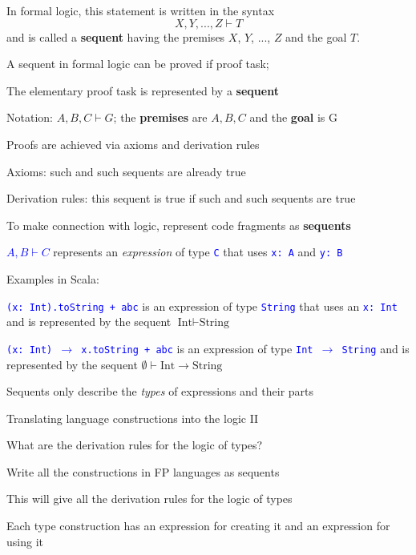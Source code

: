 In formal logic, this statement is written in the syntax
\[
X,Y,...,Z\vdash T
\]
and is called a \textbf{sequent} having
the premises $X$, $Y$, ..., $Z$ and the goal $T$.

A sequent in formal logic can be proved if proof task;

The elementary proof task is represented by a \textbf{sequent}

Notation: $A,B,C\vdash G$; the \textbf{premises} are $A,B,C$ and
the \textbf{goal} is G

Proofs are achieved via axioms and derivation rules

Axioms: such and such sequents are already true

Derivation rules: this sequent is true if such and such sequents are
true

To make connection with logic, represent code fragments as \textbf{sequents}

\textcolor{blue}{$A,B\vdash C$} represents an \emph{expression} of
type \texttt{\textcolor{blue}{\footnotesize{}C}} that uses \texttt{\textcolor{blue}{\footnotesize{}x:\ A}}
and \texttt{\textcolor{blue}{\footnotesize{}y:\ B}}{\footnotesize\par}

Examples in Scala:

\texttt{\textcolor{blue}{\footnotesize{}(x:\ Int).toString + \textquotedbl abc\textquotedbl}}
is an expression of type \texttt{\textcolor{blue}{\footnotesize{}String}}
that uses an \texttt{\textcolor{blue}{\footnotesize{}x:\ Int}} and
is represented by the sequent $\text{Int}\vdash\text{String}$

\texttt{\textcolor{blue}{\footnotesize{}(x:\ Int) $\rightarrow$
x.toString + \textquotedbl abc\textquotedbl}} is an expression
of type \texttt{\textcolor{blue}{\footnotesize{}Int $\rightarrow$
String}} and is represented by the sequent $\emptyset\vdash\text{Int}\rightarrow\text{String}$

Sequents only describe the \emph{types} of expressions and their parts

Translating language constructions into the logic II

What are the derivation rules for the logic of types?

Write all the constructions in FP languages as sequents

This will give all the derivation rules for the logic of types

Each type construction has an expression for creating it and an expression
for using it

